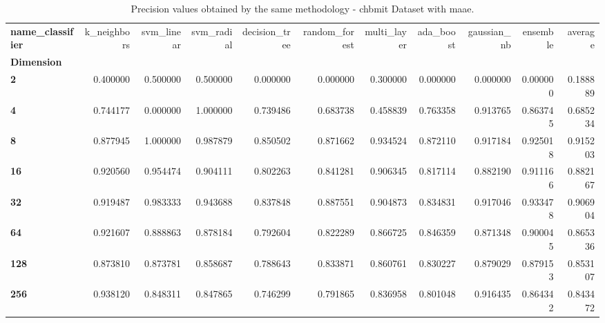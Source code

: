 \begin{table}
\centering
\caption{Precision values obtained by the same methodology - chbmit Dataset with maae.}
\label{precision_chbmit_maae-reproduction}
\begin{tabular}{lrrrrrrrrrr}
\toprule
\textbf{name\_classifier} &  k\_neighbors &  svm\_linear &  svm\_radial &  decision\_tree &  random\_forest &  multi\_layer &  ada\_boost &  gaussian\_nb &  ensemble &   average \\
\textbf{Dimension} &              &             &             &                &                &              &            &              &           &           \\
\midrule
\textbf{2        } &     0.400000 &    0.500000 &    0.500000 &       0.000000 &       0.000000 &     0.300000 &   0.000000 &     0.000000 &  0.000000 &  0.188889 \\
\textbf{4        } &     0.744177 &    0.000000 &    1.000000 &       0.739486 &       0.683738 &     0.458839 &   0.763358 &     0.913765 &  0.863745 &  0.685234 \\
\textbf{8        } &     0.877945 &    1.000000 &    0.987879 &       0.850502 &       0.871662 &     0.934524 &   0.872110 &     0.917184 &  0.925018 &  0.915203 \\
\textbf{16       } &     0.920560 &    0.954474 &    0.904111 &       0.802263 &       0.841281 &     0.906345 &   0.817114 &     0.882190 &  0.911166 &  0.882167 \\
\textbf{32       } &     0.919487 &    0.983333 &    0.943688 &       0.837848 &       0.887551 &     0.904873 &   0.834831 &     0.917046 &  0.933478 &  0.906904 \\
\textbf{64       } &     0.921607 &    0.888863 &    0.878184 &       0.792604 &       0.822289 &     0.866725 &   0.846359 &     0.871348 &  0.900045 &  0.865336 \\
\textbf{128      } &     0.873810 &    0.873781 &    0.858687 &       0.788643 &       0.833871 &     0.860761 &   0.830227 &     0.879029 &  0.879153 &  0.853107 \\
\textbf{256      } &     0.938120 &    0.848311 &    0.847865 &       0.746299 &       0.791865 &     0.836958 &   0.801048 &     0.916435 &  0.864342 &  0.843472 \\
\bottomrule
\end{tabular}
\end{table}
